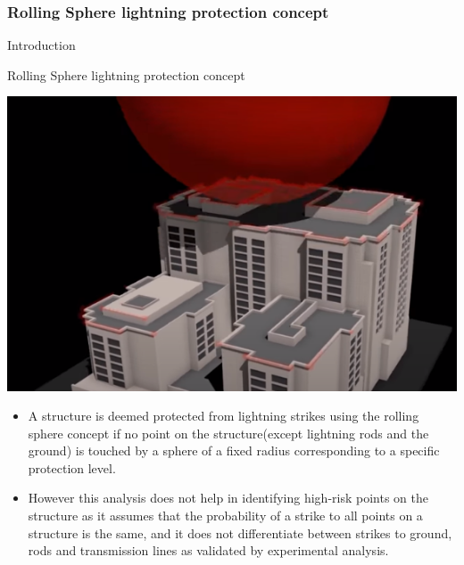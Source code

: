 \documentclass{beamer}
\begin{document}
\subsubsection{Rolling Sphere lightning protection concept}
\begin{frame}{Introduction}\vspace{-2mm}
\begin{block}{Rolling Sphere lightning protection concept}
    \par \centering \href{run:sls-rolling-sphere-animation.mp4}{\includegraphics[width=0.4\columnwidth]{Figures/Rolling_sphere.png}}
    \vspace{-2mm}
    \begin{itemize}\justifying
        \item A structure is deemed protected from lightning strikes using the rolling sphere concept if no point on the structure(except lightning rods and the ground) is touched by a sphere of a fixed radius corresponding to a specific protection level.\vspace{-1mm}
        \item However this analysis does not help in identifying high-risk points on the structure as it assumes that the probability of a strike to all points on a structure is the same, and it does not differentiate between strikes to ground, rods and transmission lines as validated by experimental analysis.
    \end{itemize}
\end{block}
\end{frame}
\end{document}
